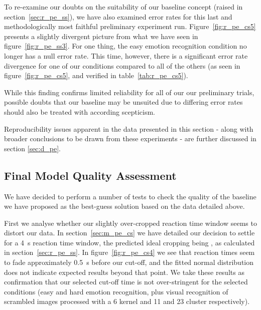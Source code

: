 	    To re-examine our doubts on the suitability of our baseline concept (raised in section~\ref{sec:r_pe_ss}), we have also examined error rates for this last and methodologically most faithful preliminary experiment run.
	    Figure~\ref{fig:r_pe_cs5} presents a slightly divergent picture from what we have seen in figure~\ref{fig:r_pe_ss3}.
	    For one thing, the easy emotion recognition condition no longer has a null error rate.
	    This time, however, there is a significant error rate divergence for one of our conditions compared to all of the others (as seen in figure~\ref{fig:r_pe_cs5}, and verified in table~\ref{tab:r_pe_cs5}).
	
	    While this finding confirms limited reliability for all of our our preliminary trials, possible doubts that our baseline may be unsuited due to differing error rates should also be treated with according scepticism.
	    
	    Reproducibility issues apparent in the data presented in this section - along with broader conclusions to be drawn from these experiments - are further discussed in section \ref{sec:d_pe}.
	    
	\subsection{Final Model Quality Assessment}
	    We have decided to perform a number of tests to check the quality of the baseline we have proposed as the best-guess solution based on the data detailed above.
	    
	    First we analyse whether our slightly over-cropped reaction time window seems to distort our data.
	    In section~\ref{sec:m_pe_cs} we have detailed our decision to settle for a \SI{4}{\second} reaction time window, the predicted ideal cropping being , as calculated in section~\ref{sec:r_pe_ss}.
	    In figure~\ref{fig:r_pe_cs4} we see that reaction times seem to fade approximately \SI{0.5}{\second} before our cut-off, and the fitted normal distribution does not indicate expected results beyond that point.
	    We take these results as confirmation that our selected cut-off time is not over-stringent for the selected conditions (easy and hard emotion recognition, plus visual recognition of scrambled images processed with a \SI{6}{\pixel} kernel and \SI{11}{\pixel} and \SI{23}{\pixel} cluster respectively).	    
	    
